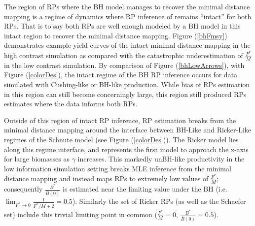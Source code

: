The region of RPs where the BH model manages to recover the minimal 
distance mapping is a regime of dynamics where RP inference of remains 
``intact'' for both RPs.
That is to say both RPs are well enough modeled by a BH model in this intact 
region to recover the minimal distance mapping. 
Figure (\ref{bhFmsy}) demonstrates example yield curves of the intact minimal distance 
mapping in the high contrast simulation as compared with the catastrophic underestimation 
of $\frac{F^*}{M}$ in the low contrast simulation.
By comparison of Figure (\ref{bhLowArrows}), with Figure (\ref{colorDes}), the intact regime of 
the BH RP inference occurs for data simulated with Cushing-like or BH-like production. 
While bias of RPs estimation in this region can still become concerningly large, 
this region still produced RPs estimates where the data informs both RPs.

%
Outside of this region of intact RP inference, RP estimation breaks from the minimal 
distance mapping around the interface between BH-Like and Ricker-Like regimes 
of the Schnute model (see Figure (\ref{colorDes})). The Ricker model lies 
along this regime interface, and represents the first model to approach the 
x-axis for large biomasses as $\gamma$ increases. This markedly unBH-like 
productivity in the low information simulation setting breaks MLE inference 
from the minimal distance mapping and instead maps RPs to extremely low values 
of $\frac{F^*}{M}$; consequently $\frac{B^*}{\bar B(0)}$ is estimated near the 
limiting value under the BH (i.e. $\lim_{F^* \to 0}\frac{1}{F^*/M+2}=0.5$).
Similarly the set of Ricker RPs (as well as the Schaefer set) include this
trivial limiting point in common ($\frac{F^*}{M}=0$, $\frac{B^*}{\bar B(0)}=0.5$). 

